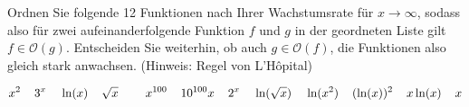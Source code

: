 \item Ordnen Sie folgende 12 Funktionen nach Ihrer Wachstumsrate für $x\to\infty$, sodass also für zwei aufeinanderfolgende Funktion $f$ und $g$ in der geordneten Liste gilt $f \in \mathcal{O}(g)$. Entscheiden Sie weiterhin, ob auch $g \in \mathcal{O}(f)$, die Funktionen also gleich stark anwachsen.
(Hinweis: Regel von L'Hôpital)

$$
x^2 \hskip 4mm  3^x \hskip 4mm \ln(x) \hskip 4mm \sqrt{x} \hskip 4mm \hskip 4mm x^{100} \hskip 4mm 10^{100}x \hskip 4mm 2^x \hskip 4mm \ln(\sqrt{x}) \hskip 4mm \ln(x^2) \hskip 4mm (\ln(x))^2 \hskip 4mm x\ln(x) \hskip 4mm x
$$
